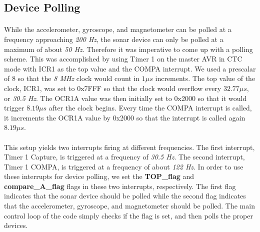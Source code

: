 \subsection{Device Polling}

\paragraph{}
While the accelerometer, gyroscope, and magnetometer can be polled at a frequency approaching {\it 200 Hz}, the sonar device can only be polled at a maximum of about {\it 50 Hz}.  Therefore it was imperative to come up with a polling scheme.  This was accomplished by using Timer 1 on the master AVR in CTC mode with ICR1 as the top value and the COMPA interrupt.  We used a prescalar of 8 so that the {\it 8 MHz} clock would count in $1 \mu s$ increments.  The top value of the clock, ICR1, was set to 0x7FFF so that the clock would overflow every $32.77 \mu s$, or {\it 30.5 Hz}.  The OCR1A value was then initially set to 0x2000 so that it would trigger $8.19 \mu s$ after the clock begins.  Every time the COMPA interrupt is called, it increments the OCR1A value by 0x2000 so that the interrupt is called again $8.19 \mu s$.  

\paragraph{}
This setup yields two interrupts firing at different frequencies.  The first interrupt, Timer 1 Capture, is triggered at a frequency of {\it 30.5 Hz}.  The second interrupt, Timer 1 COMPA, is triggered at a frequency of about {\it 122 Hz}.  In order to use these interrupts for device polling, we set the {\bf TOP\_flag} and {\bf compare\_A\_flag} flags in these two interrupts, respectively.  The first flag indicates that the sonar device should be polled while the second flag indicates that the accelerometer, gyroscope, and magnetometer should be polled.  The main control loop of the code simply checks if the flag is set, and then polls the proper devices.
